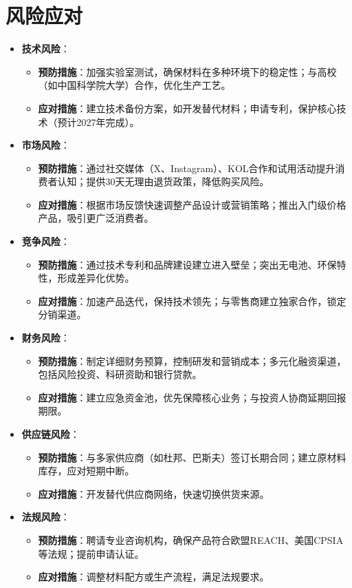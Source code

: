 \documentclass[UTF8]{report}
\theoremstyle{MyLineTheoremStyle} %
\theoremstyle{MyBlockTheoremStyle} %
\theoremstyle{MySubsubsectionStyle} %
\begin{document}
\section{风险应对}
\begin{itemize}[itemsep=1ex,leftmargin=*]
  \item \textbf{技术风险}：
    \begin{itemize}[itemsep=0.5ex,leftmargin=1.5em]
      \item \textbf{预防措施}：加强实验室测试，确保材料在多种环境下的稳定性；与高校（如中国科学院大学）合作，优化生产工艺。
      \item \textbf{应对措施}：建立技术备份方案，如开发替代材料；申请专利，保护核心技术（预计2027年完成）。
    \end{itemize}
  \item \textbf{市场风险}：
    \begin{itemize}[itemsep=0.5ex,leftmargin=1.5em]
      \item \textbf{预防措施}：通过社交媒体（X、Instagram）、KOL合作和试用活动提升消费者认知；提供30天无理由退货政策，降低购买风险。
      \item \textbf{应对措施}：根据市场反馈快速调整产品设计或营销策略；推出入门级价格产品，吸引更广泛消费者。
    \end{itemize}
  \item \textbf{竞争风险}：
    \begin{itemize}[itemsep=0.5ex,leftmargin=1.5em]
      \item \textbf{预防措施}：通过技术专利和品牌建设建立进入壁垒；突出无电池、环保特性，形成差异化优势。
      \item \textbf{应对措施}：加速产品迭代，保持技术领先；与零售商建立独家合作，锁定分销渠道。
    \end{itemize}
  \item \textbf{财务风险}：
    \begin{itemize}[itemsep=0.5ex,leftmargin=1.5em]
      \item \textbf{预防措施}：制定详细财务预算，控制研发和营销成本；多元化融资渠道，包括风险投资、科研资助和银行贷款。
      \item \textbf{应对措施}：建立应急资金池，优先保障核心业务；与投资人协商延期回报期限。
    \end{itemize}
  \item \textbf{供应链风险}：
    \begin{itemize}[itemsep=0.5ex,leftmargin=1.5em]
      \item \textbf{预防措施}：与多家供应商（如杜邦、巴斯夫）签订长期合同；建立原材料库存，应对短期中断。
      \item \textbf{应对措施}：开发替代供应商网络，快速切换供货来源。
    \end{itemize}
  \item \textbf{法规风险}：
    \begin{itemize}[itemsep=0.5ex,leftmargin=1.5em]
      \item \textbf{预防措施}：聘请专业咨询机构，确保产品符合欧盟REACH、美国CPSIA等法规；提前申请认证。
      \item \textbf{应对措施}：调整材料配方或生产流程，满足法规要求。
    \end{itemize}
\end{itemize}
\end{document}
